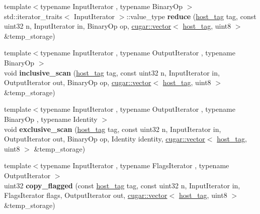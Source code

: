 \begin{DoxyCompactItemize}
\item 
\mbox{\label{namespacecugar_a2fe99abf3c832db6ddd5164856bab153}} 
{\footnotesize template$<$typename Input\+Iterator , typename Binary\+Op $>$ }\\std\+::iterator\+\_\+traits$<$ Input\+Iterator $>$\+::value\+\_\+type {\bfseries reduce} (\hyperlink{structcugar_1_1host__tag}{host\+\_\+tag} tag, const uint32 n, Input\+Iterator in, Binary\+Op op, \hyperlink{structcugar_1_1vector}{cugar\+::vector}$<$ \hyperlink{structcugar_1_1host__tag}{host\+\_\+tag}, uint8 $>$ \&temp\+\_\+storage)
\item 
\mbox{\label{namespacecugar_a52e9966fe20e557f22823e2d6c173e0e}} 
{\footnotesize template$<$typename Input\+Iterator , typename Output\+Iterator , typename Binary\+Op $>$ }\\void {\bfseries inclusive\+\_\+scan} (\hyperlink{structcugar_1_1host__tag}{host\+\_\+tag} tag, const uint32 n, Input\+Iterator in, Output\+Iterator out, Binary\+Op op, \hyperlink{structcugar_1_1vector}{cugar\+::vector}$<$ \hyperlink{structcugar_1_1host__tag}{host\+\_\+tag}, uint8 $>$ \&temp\+\_\+storage)
\item 
\mbox{\label{namespacecugar_ae460dc5c3055b7760d896b2535f4d9be}} 
{\footnotesize template$<$typename Input\+Iterator , typename Output\+Iterator , typename Binary\+Op , typename Identity $>$ }\\void {\bfseries exclusive\+\_\+scan} (\hyperlink{structcugar_1_1host__tag}{host\+\_\+tag} tag, const uint32 n, Input\+Iterator in, Output\+Iterator out, Binary\+Op op, Identity identity, \hyperlink{structcugar_1_1vector}{cugar\+::vector}$<$ \hyperlink{structcugar_1_1host__tag}{host\+\_\+tag}, uint8 $>$ \&temp\+\_\+storage)
\item 
\mbox{\label{namespacecugar_a0a712be719923c1b75f550237006730e}} 
{\footnotesize template$<$typename Input\+Iterator , typename Flags\+Iterator , typename Output\+Iterator $>$ }\\uint32 {\bfseries copy\+\_\+flagged} (const \hyperlink{structcugar_1_1host__tag}{host\+\_\+tag} tag, const uint32 n, Input\+Iterator in, Flags\+Iterator flags, Output\+Iterator out, \hyperlink{structcugar_1_1vector}{cugar\+::vector}$<$ \hyperlink{structcugar_1_1host__tag}{host\+\_\+tag}, uint8 $>$ \&temp\+\_\+storage)
\item 

\end{DoxyCompactItemize}
